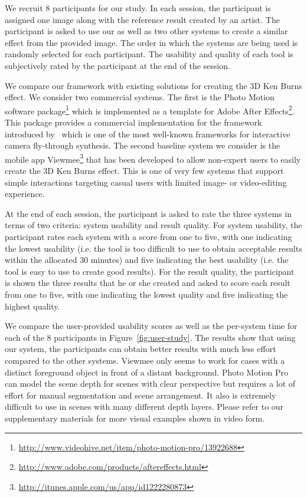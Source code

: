 \documentclass[acmtog,authorversion]{acmart}
\begin{document}
We recruit 8 participants for our study. In each session, the participant is assigned one image along with the reference result created by an artist. The participant is asked to use our as well as two other systems to create a similar effect from the provided image. The order in which the systems are being used is randomly selected for each participant. The usability and quality of each tool is subjectively rated by the participant at the end of the session.

We compare our framework with existing solutions for creating the 3D Ken Burns effect. We consider two commercial systems. The first is the Photo Motion software package\footnote{\url{http://www.videohive.net/item/photo-motion-pro/13922688}} which is implemented as a template for Adobe After Effects\footnote{\url{http://www.adobe.com/products/aftereffects.html}}. This package provides a commercial implementation for the framework introduced by~\cite{Horry_OTHER_1997} which is one of the most well-known frameworks for interactive camera fly-through synthesis. The second baseline system we consider is the mobile app Viewmee\footnote{\url{http://itunes.apple.com/us/app/id1222280873}} that has been developed to allow non-expert users to easily create the 3D Ken Burns effect. This is one of very few systems that support simple interactions targeting casual users with limited image- or video-editing experience. 

At the end of each session, the participant is asked to rate the three systems in terms of two criteria: system usability and result quality. For system usability, the participant rates each system with a score from one to five, with one indicating the lowest usability (i.e. the tool is too difficult to use to obtain acceptable results within the allocated 30 minutes) and five indicating the best usability (i.e. the tool is easy to use to create good results). For the result quality, the participant is shown the three results that he or she created and asked to score each result from one to five, with one indicating the lowest quality and five indicating the highest quality.

We compare the user-provided usability scores as well as the per-system time for each of the 8 participants in Figure~\ref{fig:user-study}. The results show that using our system, the participants can obtain better results with much less effort compared to the other systems. Viewmee only seems to work for cases with a distinct foreground object in front of a distant background. Photo Motion Pro can model the scene depth for scenes with clear perspective but requires a lot of effort for manual segmentation and scene arrangement. It also is extremely difficult to use in scenes with many different depth layers. Please refer to our supplementary materials for more visual examples shown in video form.
\end{document}
